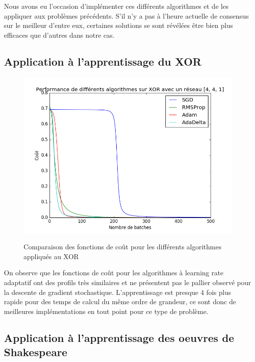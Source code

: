 Nous avons eu l'occasion d'implémenter ces différents algorithmes et de les appliquer aux problèmes précédents. S'il n'y a pas à l'heure actuelle de consensus sur le meilleur d'entre eux, certaines solutions se sont révélées être bien plus efficaces que d'autres dans notre cas.

\subsection{Application à l'apprentissage du XOR}

\begin{figure}[!h]
\begin{center}
	{\includegraphics[scale=0.4]{images/chapter8/xor_comparison_algo.png}\label{Algorithmes}}
  \caption{Comparaison des fonctions de coût pour les différents algorithmes appliqués au XOR}
\end{center}
\end{figure}

On observe que les fonctions de coût pour les algorithmes à learning rate adaptatif ont des profils très similaires et ne présentent pas le pallier observé pour la descente de gradient stochastique. L'apprentissage est presque 4 fois plus rapide pour des temps de calcul du même ordre de grandeur, ce sont donc de meilleures implémentations en tout point pour ce type de problème.

\subsection{Application à l'apprentissage des oeuvres de Shakespeare}

